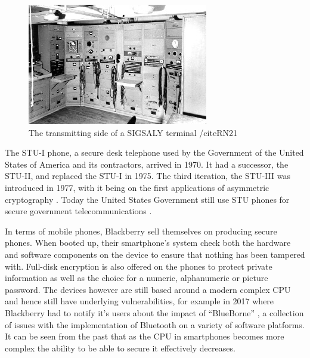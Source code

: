 \begin{figure}
	\includegraphics[width=\linewidth]{terminal.jpg}
	\caption{The transmitting side of a SIGSALY terminal /cite{RN21}}
	\label{fig:SIGSALY}
\end{figure}

The STU-I phone, a secure desk telephone used by the Government of the United States of America and its contractors, arrived in 1970.
It had a successor, the STU-II, and replaced the STU-I in 1975.
The third iteration, the STU-III was introduced in 1977, with it being on the first applications of asymmetric cryptography \cite{RN30}.
Today the United States Government still use STU phones for secure government telecommunications \cite{RN30}.

In terms of mobile phones, Blackberry sell themselves on producing secure phones.
When booted up, their smartphone’s system check both the hardware and software components on the device to ensure that nothing has been tampered with.
Full-disk encryption is also offered on the phones to protect private information as well as the choice for a numeric, alphanumeric or picture password.
The devices however are still based around a modern complex CPU and hence still have underlying vulnerabilities, for example in 2017 where Blackberry had to notify it’s users about the impact of “BlueBorne” \cite{RN20}, a collection of issues with the implementation of Bluetooth on a variety of software platforms. 
	It can be seen from the past that as the CPU in smartphones becomes more complex the ability to be able to secure it effectively decreases. 


